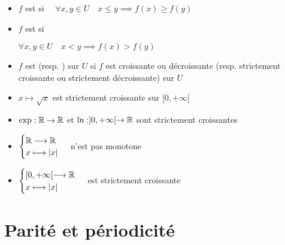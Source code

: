 \begin{frame}

\begin{mydefinition}
\begin{itemize}  
  \item $f$ est   si \ \ 
  $\forall x,y\in U \quad  x\leq y \implies f(x)\geq f(y)$
  
  \item $f$ est  si 
  
  \hfill
  $\forall x,y\in U \quad  x< y \implies f(x)> f(y)$
  
\pause
  
 \item $f$ est  (resp. ) sur $U$ si 
 $f$ est croissante ou décroissante (resp. strictement croissante ou 
 strictement décroissante) sur $U$
\end{itemize}
\end{mydefinition}
  
\end{frame}

\begin{frame}

\begin{exemple}
\begin{itemize}
  \item $x\mapsto \sqrt x$ est strictement croissante sur $[0,+\infty[$
\pause
  \item $\exp: \mathbb{R}\to\mathbb{R}$ et $\ln :]0,+\infty[\to\mathbb{R}$ sont strictement croissantes
\pause  
  \item $\begin{cases} \mathbb{R} \longrightarrow \mathbb{R} \\ x\longmapsto |x| \end{cases}$ 
  n'est pas monotone
\pause  
  \item $\begin{cases} [0,+\infty[ \longrightarrow \mathbb{R} \\ x\longmapsto |x| \end{cases}$ 
  est strictement croissante
\end{itemize}
\end{exemple}

\end{frame}



\section{Parité et périodicité}

